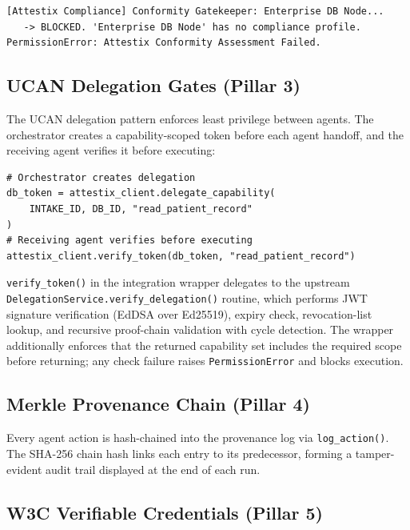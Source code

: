 \begin{lstlisting}[caption=Conformity gatekeeper blocking an unregistered agent]
[Attestix Compliance] Conformity Gatekeeper: Enterprise DB Node...
   -> BLOCKED. 'Enterprise DB Node' has no compliance profile.
PermissionError: Attestix Conformity Assessment Failed.
\end{lstlisting}

\subsection{UCAN Delegation Gates (Pillar 3)}

The UCAN delegation pattern enforces least privilege between agents. The orchestrator creates a capability-scoped token before each agent handoff, and the receiving agent verifies it before executing:

\begin{lstlisting}[caption=UCAN delegation and verification]
# Orchestrator creates delegation
db_token = attestix_client.delegate_capability(
    INTAKE_ID, DB_ID, "read_patient_record"
)
# Receiving agent verifies before executing
attestix_client.verify_token(db_token, "read_patient_record")
\end{lstlisting}

\texttt{verify\_token()} in the integration wrapper delegates to the upstream \texttt{DelegationService.verify\_delegation()} routine, which performs JWT signature verification (EdDSA over Ed25519), expiry check, revocation-list lookup, and recursive proof-chain validation with cycle detection. The wrapper additionally enforces that the returned capability set includes the required scope before returning; any check failure raises \texttt{PermissionError} and blocks execution.

\subsection{Merkle Provenance Chain (Pillar 4)}

Every agent action is hash-chained into the provenance log via \texttt{log\_action()}. The SHA-256 chain hash links each entry to its predecessor, forming a tamper-evident audit trail displayed at the end of each run.

\subsection{W3C Verifiable Credentials (Pillar 5)}

